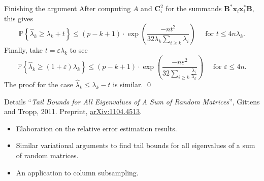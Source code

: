 \documentclass[xcolor={svgnames,pdftex,dvipsnames,table},10pt]{beamer} %
\newcommand{\mat}[1]{\ensuremath{\mathbf{#1}}}
\newcommand{\Prob}[1]{\ensuremath{\mathbb{P}\left\{#1 \right\}}}
\renewcommand{\star}{*}
\begin{document}
\begin{frame}{Finishing the argument}
 After computing $A$ and $\mat{C}_i^2$ for the summands $\mat{B}^\star \mat{x}_i \mat{x}_i^\star \mat{B},$ this gives
\[
 \Prob{\hat{\lambda}_k \geq \lambda_k +t} \leq (p-k+1)\cdot \exp\left( \frac{-nt^2}{32\lambda_k \sum_{i \geq k} \lambda_i } \right) \quad \text{ for } t \leq 4n \lambda_k.
\]
Finally, take $t = \varepsilon \lambda_k$ to see
\[
 \Prob{\hat{\lambda}_k \geq (1+\varepsilon) \lambda_k} \leq (p-k+1)\cdot \exp\left( \frac{-n\varepsilon^2}{32\sum_{i \geq k} \frac{\lambda_i}{\lambda_k} } \right) \quad \text{ for } \varepsilon \leq 4n.
\]
The proof for the case $\hat{\lambda}_k \leq \lambda_k - t$ is similar.
\qed
\end{frame}

\begin{frame}{Details}
``{\it Tail Bounds for All Eigenvalues of A Sum of Random Matrices}'', Gittens and Tropp, 2011. Preprint, \href{http://arxiv.org/abs/1104.4513}{arXiv:1104.4513}.
\begin{itemize}
\item Elaboration on the relative error estimation results.
\item Similar variational arguments to find tail bounds for all eigenvalues of a sum of random matrices.
\item An application to column subsampling.
\end{itemize}

\end{frame}
\end{document}
